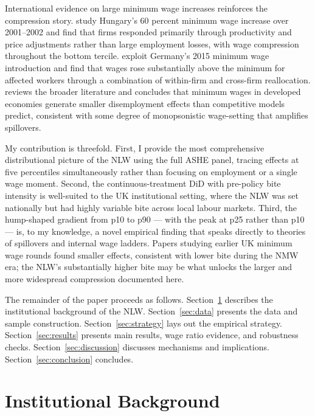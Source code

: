 \documentclass[12pt]{article}
\begin{document}
International evidence on large minimum wage increases reinforces the compression story. \citet{harasztosi2019pays} study Hungary's 60 percent minimum wage increase over 2001--2002 and find that firms responded primarily through productivity and price adjustments rather than large employment losses, with wage compression throughout the bottom tercile. \citet{dustmann2022reallocation} exploit Germany's 2015 minimum wage introduction and find that wages rose substantially above the minimum for affected workers through a combination of within-firm and cross-firm reallocation. \citet{manning2021elusive} reviews the broader literature and concludes that minimum wages in developed economies generate smaller disemployment effects than competitive models predict, consistent with some degree of monopsonistic wage-setting that amplifies spillovers.

My contribution is threefold. First, I provide the most comprehensive distributional picture of the NLW using the full ASHE panel, tracing effects at five percentiles simultaneously rather than focusing on employment or a single wage moment. Second, the continuous-treatment DiD with pre-policy bite intensity is well-suited to the UK institutional setting, where the NLW was set nationally but had highly variable bite across local labour markets. Third, the hump-shaped gradient from p10 to p90 --- with the peak at p25 rather than p10 --- is, to my knowledge, a novel empirical finding that speaks directly to theories of spillovers and internal wage ladders. Papers studying earlier UK minimum wage rounds \citep{dickens2010minimum, manning2016impact} found smaller effects, consistent with lower bite during the NMW era; the NLW's substantially higher bite may be what unlocks the larger and more widespread compression documented here.

The remainder of the paper proceeds as follows. Section~\ref{sec:background} describes the institutional background of the NLW. Section~\ref{sec:data} presents the data and sample construction. Section~\ref{sec:strategy} lays out the empirical strategy. Section~\ref{sec:results} presents main results, wage ratio evidence, and robustness checks. Section~\ref{sec:discussion} discusses mechanisms and implications. Section~\ref{sec:conclusion} concludes.

\section{Institutional Background}
\label{sec:background}
\end{document}
